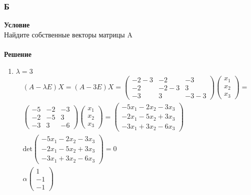 		\subsubsection*{\textbf{Б}}
		\textbf{Условие}\\
		Найдите собственные векторы матрицы A\\
		\\
		\textbf{Решение}\\
		\begin{enumerate}
		\item $\lambda = 3$
			\begin{gather*}
				(A-\lambda E)X = 
				(A-3E)X = 
				\begin{pmatrix}
					-2-3 & -2 & -3 \\
					-2 & -2-3 & 3 \\
					-3 & 3 & -3-3
				\end{pmatrix}
				\begin{pmatrix}
					x_1 \\ x_2 \\ x_3
				\end{pmatrix}
				=\\
				\begin{pmatrix}
					-5 & -2 & -3 \\
					-2 & -5 & 3 \\
					-3 & 3 & -6
				\end{pmatrix}
				\begin{pmatrix}
					x_1 \\ x_2 \\ x_3
				\end{pmatrix}
				=
				\begin{pmatrix}
					-5x_1 -2x_2 -3x_3 \\
					-2x_1 -5x_2 +3x_3 \\
					-3x_1 + 3x_2 -6x_3
				\end{pmatrix}
				\\
				\text{det}
				\begin{pmatrix}
					-5x_1 -2x_2 -3x_3 \\
					-2x_1 -5x_2 +3x_3 \\
					-3x_1 + 3x_2 -6x_3
				\end{pmatrix}
				= 0
				\\
				\alpha
				\begin{pmatrix}
					1\\ -1 \\ -1
				\end{pmatrix}
			\end{gather*}

\end{enumerate}
